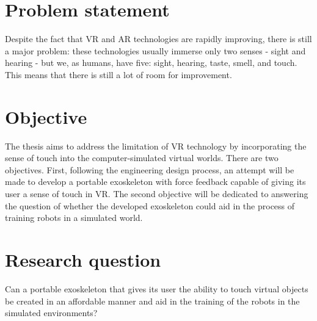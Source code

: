 \section{Problem statement}
Despite the fact that VR and AR technologies are rapidly improving, there is still a major problem: these technologies usually immerse only two senses - sight and hearing - but we, as humans, have five: sight, hearing, taste, smell, and touch. This means that there is still a lot of room for improvement.

\section{Objective}
The thesis aims to address the limitation of VR technology by incorporating the sense of touch into the computer-simulated virtual worlds. There are two objectives. First, following the engineering design process, an attempt will be made to develop a portable exoskeleton with force feedback capable of giving its user a sense of touch in VR. The second objective will be dedicated to answering the question of whether the developed exoskeleton could aid in the process of training robots in a simulated world.

\section{Research question}
Can a portable exoskeleton that gives its user the ability to touch virtual objects be created in an affordable manner and aid in the training of the robots in the simulated environments?